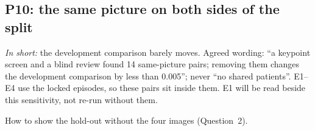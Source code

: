 \documentclass[10pt,a4paper]{article}
\newenvironment{parts}{\begin{description}[style=unboxed, leftmargin=0pt, itemsep=3pt, font=\normalfont\bfseries\itshape]}{\end{description}}
\newenvironment{topic}[2]{\subsection{#1}\label{#2}\begin{parts}}{\end{parts}}
\begin{document}
\begin{topic}{P10: the same picture on both sides of the split}{sec:p10}
\smallskip
{}

\smallskip
\noindent
\emph{In short:} the development comparison barely moves. Agreed wording: ``a keypoint screen and a blind review
found 14 same-picture pairs; removing them changes the development comparison by less than 0.005''; never ``no
shared patients''. E1--E4 use the locked episodes, so these pairs sit inside them. E1 will be read beside this
sensitivity, not re-run without them.
\item[What I need from you.] How to show the hold-out without the four images (Question~2).
\end{topic}
\end{document}
